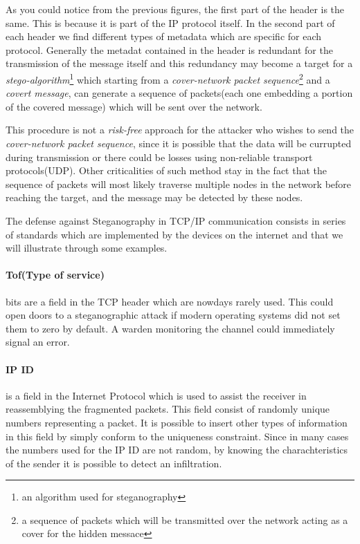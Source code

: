 \documentclass[../../main.tex]{subfiles}
\begin{document}
    As you could notice from the previous figures, the first part of the header
    is the same. This is because it is part of the IP protocol itself.
    In the second part of each header we find different types of metadata which
    are specific for each protocol. Generally the metadat contained in the
    header is redundant for the transmission of the message itself and this 
    redundancy may become a target for a \emph{stego-algorithm}\footnote{an
    algorithm used for steganography} which starting from a \emph{cover-network
    packet sequence}\footnote{a sequence of packets which will be transmitted
    over the network acting as a cover for the hidden messace} and a
    \emph{covert message}, can generate a sequence of packets(each one embedding
    a portion of the covered message) which will be sent over the network.

    This procedure is not a \emph{risk-free} approach for the attacker who
    wishes to send the \emph{cover-network packet sequence}, since it is
    possible that the data will be currupted during transmission or there could
    be losses using non-reliable transport protocols(UDP).
    Other criticalities of such method stay in the fact that the sequence of
    packets will most likely traverse multiple nodes in the network before
    reaching the target, and the message may be detected by these nodes.

    The defense against Steganography in TCP/IP communication consists in 
    series of standards which are implemented by the devices on the internet and
    that we will illustrate through some examples.


    \paragraph{Tof(Type of service)} bits are a field in the TCP header which
    are nowdays rarely used. This could open doors to a steganographic attack if
    modern operating systems did not set them to zero by default.
    A warden monitoring the channel could immediately signal an error.

    \paragraph{IP ID} is a field in the Internet Protocol which is used to
    assist the receiver in reassemblying the fragmented packets.
    This field consist of randomly unique numbers representing a packet.
    It is possible to insert other types of information in this field by simply
    conform to the uniqueness constraint.
    Since in many cases the numbers used for the IP ID are not random, by
    knowing the charachteristics of the sender it is possible to detect an
    infiltration.
\end{document}
